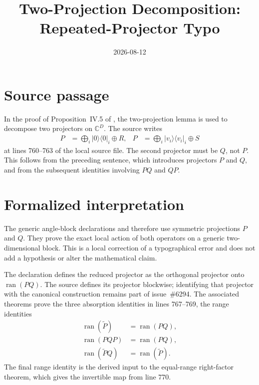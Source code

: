 \documentclass{article}
\title{Two-Projection Decomposition: Repeated-Projector Typo}
\author{}
\date{2026-08-12}
\begin{document}
\maketitle

\section{Source passage}

In the proof of Proposition~IV.5 of \cite{Cirac2017MPU}, the two-projection
lemma is used to decompose two projectors on $\mathbb C^D$. The source writes
\begin{align}
  P&=\bigoplus_i |0\rangle\langle 0|_i\oplus R,
  &P&=\bigoplus_i |v_i\rangle\langle v_i|_i\oplus S
\end{align}
at lines 760--763 of the local source file. The second projector must be $Q$,
not $P$. This follows from the preceding sentence, which introduces projectors
$P$ and $Q$, and from the subsequent identities involving $PQ$ and $QP$.

\section{Formalized interpretation}

The generic angle-block declarations
 and
therefore use symmetric projections $P$ and $Q$. They prove the exact local
action of both operators on a generic two-dimensional block. This is a local
correction of a typographical error and does not add a hypothesis or alter the
mathematical claim.

The declaration
 defines the reduced
projector as the orthogonal projector onto $\operatorname{ran}(PQ)$. The source
defines its projector blockwise; identifying that projector with the canonical
construction remains part of issue~\#6294. The associated theorems prove the
three absorption identities in lines 767--769, the range identities
\begin{align}
  \operatorname{ran}(\widetilde P)&=\operatorname{ran}(PQ),\\
  \operatorname{ran}(PQP)&=\operatorname{ran}(PQ),\\
  \operatorname{ran}(\widetilde P Q)&=\operatorname{ran}(\widetilde P).
\end{align}
The final range identity is the derived input to the equal-range right-factor
theorem, which gives the invertible map from line 770.
\end{document}
